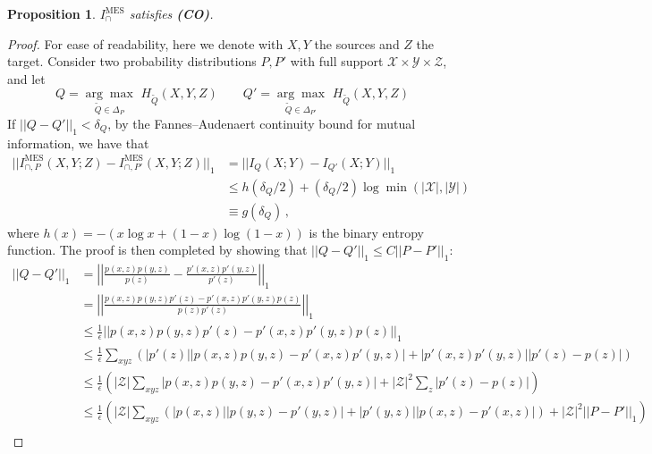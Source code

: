 \documentclass{article}
\newcommand{\CO}{\textbf{(CO)}\xspace} %
\newcommand{\IMES}{\ensuremath{I_\cap^{\text{MES}}}\xspace}
\newtheorem{proposition}{Proposition}
\begin{document}
\begin{proposition} \label{prop:MES-CO}
    $\IMES$ satisfies \CO.
\end{proposition}
\begin{proof}
    For ease of readability, here we denote with $X,Y$ the sources and $Z$ the target.
    Consider two probability distributions $P,P'$ with full support $\mathcal{X}\times\mathcal{Y}\times\mathcal{Z}$, and let 
    \begin{equation}
        Q = \underset{\tilde{Q} \in \Delta_P}{\arg\max}\,\, H_{\tilde{Q}}(X,Y,Z) \qquad Q' = \underset{\tilde{Q} \in \Delta_{P'}}{\arg\max}\,\, H_{\tilde{Q}}(X,Y,Z)
    \end{equation}
    If  $||Q-Q'||_1<\delta_Q$, by the Fannes–Audenaert continuity bound for mutual information, we have that
    \begin{equation}
    \begin{aligned}
        ||I^\text{MES}_{\cap,P}(X,Y;Z) - I^\text{MES}_{\cap,P'}(X,Y;Z)||_1 & = ||I_{Q}(X;Y) - I_{Q'}(X;Y)||_1 \\ 
        & \leq h(\delta_Q/2) + (\delta_Q/2) \log \min(|\mathcal{X}|, |\mathcal{Y}|) \\
        & \equiv g(\delta_Q) \,,
    \end{aligned}
    \end{equation}
    where $h(x)=-(x\log x+(1-x)\log (1-x))$ is the binary entropy function.
    The proof is then completed by showing that $||Q-Q'||_1\leq C||P-P'||_1$:
    \begin{equation} \label{eq:MES-QPbound}
    \begin{aligned}
        ||Q-Q'||_1 & = \left|\left| \frac{p(x,z)p(y,z)}{p(z)} - \frac{p'(x,z)p'(y,z)}{p'(z)} \right|\right|_1 \\
        & = \left|\left| \frac{p(x,z)p(y,z)p'(z)-p'(x,z)p'(y,z)p(z)}{p(z)p'(z)} \right|\right|_1 \\
        & \leq \frac1\epsilon \left|\left| p(x,z)p(y,z)p'(z)-p'(x,z)p'(y,z)p(z) \right|\right|_1 \\
        & \leq \frac1\epsilon \sum_{xyz} \left(|p'(z)|\left|p(x,z)p(y,z)- p'(x,z)p'(y,z)\right|+|p'(x,z)p'(y,z)||p'(z)-p(z)|\right) \\
        & \leq \frac1\epsilon \left(|\mathcal{Z}|\sum_{xyz} \left|p(x,z)p(y,z)- p'(x,z)p'(y,z)\right|+|\mathcal{Z}|^2\sum_z|p'(z)-p(z)| \right)\\
        & \leq \frac1\epsilon \left(|\mathcal{Z}|\sum_{xyz} \left(|p(x,z)|\left|p(y,z)-p'(y,z)\right|+|p'(y,z)||p(x,z)-p'(x,z)|\right)+|\mathcal{Z}|^2 ||P-P'||_1 \right)\\

\end{aligned}
\end{equation}
\end{proof}
\end{document}
